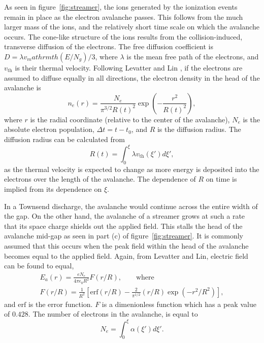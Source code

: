As seen in figure~\ref{fig:streamer}, the ions generated by the ionization
events remain in place as the electron avalanche passes. This follows from the
much larger mass of the ions, and the relatively short time scale on which the
avalanche occurs. The cone-like structure of the ions results from the
collision-induced, transverse diffusion of the electrons. The free diffusion
coefficient is $D = \lambda v_mathrm{th}(E/N_g)/3$, where $\lambda$ is the mean
free path of the electrons, and $v_\mathrm{th}$ is their thermal velocity.
Following Levatter and Lin \cite{Levatter1980}, if the electrons are assumed to
diffuse equally in all directions, the electron density in the head of the
avalanche is
\begin{equation}
  n_e(r) = \frac{N_e}{\pi^{3/2}R(t)^2}\exp\left(-\frac{r^2}{R(t)^2}\right),
  \label{eq:s_density}
\end{equation}
where $r$ is the radial coordinate (relative to the center of the avalanche),
$N_e$ is the absolute electron population, $\Delta t = t - t_0$, and $R$ is the
diffusion radius. The diffusion radius can be calculated from
\begin{equation}
  R(t) = \int_{0}^{\xi} \lambda v_\mathrm{th}(\xi') d\xi',
  \label{eq:s_rad}
\end{equation}
as the thermal velocity is expected to change as more energy is deposited into
the electrons over the length of the avalanche. The dependence of $R$ on time is
implied from its dependence on $\xi$.

In a Townsend discharge, the avalanche would continue across the entire width of
the gap. On the other hand, the avalanche of a streamer grows at such a rate
that its space charge shields out the applied field. This stalls the head of the
avalanche mid-gap as seen in part (c) of figure~\ref{fig:streamer}. It is
commonly assumed that this occurs when the peak field within the head of the
avalanche becomes equal to the applied field. Again, from Levatter and Lin,
electric field can be found to equal,
\begin{eqnarray}
  E_a(r) = \frac{eN_e}{4\pi\epsilon_0R^2} F(r/R), \qquad \mathrm{where} \\
  F(r/R) = \frac{1}{R^2}\left[\mathrm{erf}(r/R)-\frac{2}{\pi^{1/2}}
           (r/R)\exp(-r^2/R^2)\right] ,
\end{eqnarray}
and $\mathrm{erf}$ is the error function. $F$ is a dimenionless function which
has a peak value of $0.428$. The number of electrons in the avalanche, is equal
to
\begin{equation}
  N_e = \int_0^\xi \alpha(\xi')d\xi'.
  \label{eq:s_pop}
\end{equation}

